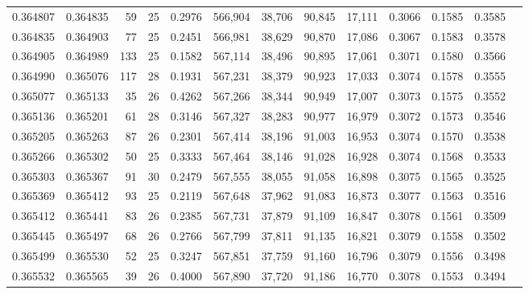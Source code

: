 \begin{tabular}{rrrrrrrrrrrrr}
0.364807 & 0.364835 &    59 &  25 &                                     0.2976 & 566,904 &  38,706 &  90,845 &  17,111 & 0.3066 & 0.1585 & 0.3585 \\
0.364835 & 0.364903 &    77 &  25 &                                     0.2451 & 566,981 &  38,629 &  90,870 &  17,086 & 0.3067 & 0.1583 & 0.3578 \\
0.364905 & 0.364989 &   133 &  25 &                                     0.1582 & 567,114 &  38,496 &  90,895 &  17,061 & 0.3071 & 0.1580 & 0.3566 \\
0.364990 & 0.365076 &   117 &  28 &                                     0.1931 & 567,231 &  38,379 &  90,923 &  17,033 & 0.3074 & 0.1578 & 0.3555 \\
0.365077 & 0.365133 &    35 &  26 &                                     0.4262 & 567,266 &  38,344 &  90,949 &  17,007 & 0.3073 & 0.1575 & 0.3552 \\
0.365136 & 0.365201 &    61 &  28 &                                     0.3146 & 567,327 &  38,283 &  90,977 &  16,979 & 0.3072 & 0.1573 & 0.3546 \\
0.365205 & 0.365263 &    87 &  26 &                                     0.2301 & 567,414 &  38,196 &  91,003 &  16,953 & 0.3074 & 0.1570 & 0.3538 \\
0.365266 & 0.365302 &    50 &  25 &                                     0.3333 & 567,464 &  38,146 &  91,028 &  16,928 & 0.3074 & 0.1568 & 0.3533 \\
0.365303 & 0.365367 &    91 &  30 &                                     0.2479 & 567,555 &  38,055 &  91,058 &  16,898 & 0.3075 & 0.1565 & 0.3525 \\
0.365369 & 0.365412 &    93 &  25 &                                     0.2119 & 567,648 &  37,962 &  91,083 &  16,873 & 0.3077 & 0.1563 & 0.3516 \\
0.365412 & 0.365441 &    83 &  26 &                                     0.2385 & 567,731 &  37,879 &  91,109 &  16,847 & 0.3078 & 0.1561 & 0.3509 \\
0.365445 & 0.365497 &    68 &  26 &                                     0.2766 & 567,799 &  37,811 &  91,135 &  16,821 & 0.3079 & 0.1558 & 0.3502 \\
0.365499 & 0.365530 &    52 &  25 &                                     0.3247 & 567,851 &  37,759 &  91,160 &  16,796 & 0.3079 & 0.1556 & 0.3498 \\
0.365532 & 0.365565 &    39 &  26 &                                     0.4000 & 567,890 &  37,720 &  91,186 &  16,770 & 0.3078 & 0.1553 & 0.3494 \\

\end{tabular}
